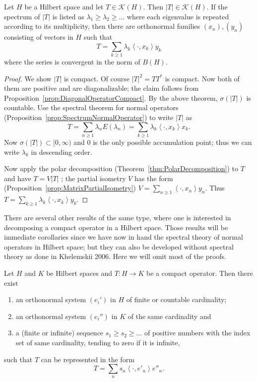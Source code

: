 \begin{corollary}
	\label{cor:CompactHilbert}

	Let $H$ be a Hilbert space and let $T \in \mathcal{K}(H)$. Then $|T| \in \mathcal{K}(H)$. If the spectrum of $|T|$ is listed as $\lambda_1 \ge \lambda_2 \ge  \ldots$ where each eigenvalue is repeated according to its multiplicity, then there are orthonormal families $(x_n), (y_n)$ consisting of vectors in $H$ such that
	\[
		T = \sum_{k\ge 1} \lambda_k \left\langle \cdot , x_k \right\rangle y_k
	\] 
	where the series is convergent in the norm of $B(H)$.
\end{corollary}
\begin{proof}
	We show $|T|$ is compact. Of course $|T|^2 = T T^*$ is compact. Now both of them are positive and are diagonalizable; the claim follows from Proposition~\ref{prop:DiagonalOperatorCompact}. 
	By the above theorem, $\sigma(|T|)$ is countable. Use the spectral theorem for normal operators (Proposition~\ref{prop:SpectrumNormalOperator}) to write $|T|$ as
	\[
		T 
		= \sum_{n\ge 1} \lambda_n E(\lambda_n)
		= \sum_{k\ge 1} \lambda_k \left\langle \cdot , x_k \right\rangle x_k
	.\] 
	Now $\sigma(|T|) \subset [0,\infty )$ and $0$ is the only possible accumulation point; thus we can write $\lambda_k$ in descending order.

	Now apply the polar decomposition (Theorem~\ref{thm:PolarDecomposition}) to $T$ and have $T = V |T|$ ; the partial isometry $V$ has the form (Proposition~\ref{prop:MatrixPartialIsometry}) $V = \sum_{n \geq 1}\left\langle\cdot, x_n\right\rangle y_n$. Thus $T=\sum_{k \geq 1} \lambda_k\left\langle\cdot, x_k\right\rangle y_k$.
\end{proof}

There are several other results of the same type, where one is interested in decomposing a compact operator in a Hilbert space. Those results will be immediate corollaries since we have now in hand the spectral theory of normal operators in Hilbert space; but they can also be developed without spectral theory as done in Khelemskii 2006. Here we will omit most of the proofs.

\begin{theorem}[Schmidt]
	\label{thm:Schmidt}
	Let $H$ and $K$ be Hilbert spaces and $T: H \to K$ be a compact operator. Then there exist
	\begin{enumerate}
		\item an orthonormal system $(e_i')$ in $H$ of finite or countable cardinality;
		\item  an orthonormal system $(e_i'')$ in $K$ of the same cardinality and
		\item a (finite or infinite) sequence $s_1 \ge s_2 \ge \ldots$ of positive numbers with the index set of same cardinality, tending to zero if it is infinite,
	\end{enumerate}
	such that $T$ can be represented in the form
	\[
		T = \sum_n s_n \left\langle \cdot , e'_n \right\rangle e''_n
	.\] 
\end{theorem}

